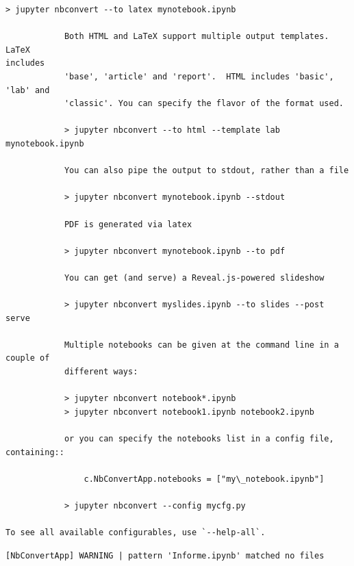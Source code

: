 \documentclass[11pt]{article}
\begin{document}
\begin{Verbatim}[commandchars=\\\{\}]
            > jupyter nbconvert --to latex mynotebook.ipynb

            Both HTML and LaTeX support multiple output templates. LaTeX
includes
            'base', 'article' and 'report'.  HTML includes 'basic', 'lab' and
            'classic'. You can specify the flavor of the format used.

            > jupyter nbconvert --to html --template lab mynotebook.ipynb

            You can also pipe the output to stdout, rather than a file

            > jupyter nbconvert mynotebook.ipynb --stdout

            PDF is generated via latex

            > jupyter nbconvert mynotebook.ipynb --to pdf

            You can get (and serve) a Reveal.js-powered slideshow

            > jupyter nbconvert myslides.ipynb --to slides --post serve

            Multiple notebooks can be given at the command line in a couple of
            different ways:

            > jupyter nbconvert notebook*.ipynb
            > jupyter nbconvert notebook1.ipynb notebook2.ipynb

            or you can specify the notebooks list in a config file, containing::

                c.NbConvertApp.notebooks = ["my\_notebook.ipynb"]

            > jupyter nbconvert --config mycfg.py

To see all available configurables, use `--help-all`.

    \end{Verbatim}

    \begin{Verbatim}[commandchars=\\\{\}]
[NbConvertApp] WARNING | pattern 'Informe.ipynb' matched no files
    \end{Verbatim}


    
    
    
\end{document}
